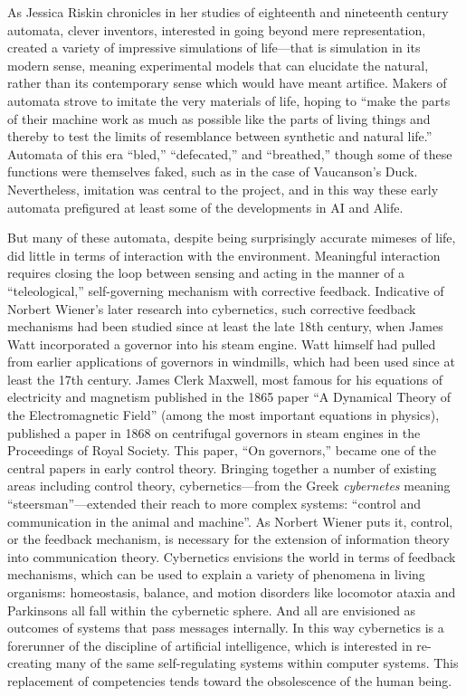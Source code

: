 As Jessica Riskin chronicles in her studies of eighteenth and
nineteenth century automata, clever inventors, interested in going
beyond mere representation, created a variety of impressive
simulations of life---that is simulation in its modern sense, meaning
experimental models that can elucidate the natural, rather than its
contemporary sense which would have meant artifice.\cite[p. ??]{riskinDuck}
Makers of automata strove to imitate the very materials of life,
hoping to ``make the parts of their machine work as much as possible
like the parts of living things and thereby to test the limits of
resemblance between synthetic and natural life.''\cite[p. ??]{riskinDuck}
Automata of this era ``bled,'' ``defecated,'' and ``breathed,'' though some
of these functions were themselves faked, such as in the case of
Vaucanson's Duck. Nevertheless, imitation was central to the project,
and in this way these early automata prefigured at least some of the
developments in AI and Alife.

But many of these automata, despite being surprisingly accurate
mimeses of life, did little in terms of interaction with the
environment. Meaningful interaction requires closing the loop between
sensing and acting in the manner of a
 ``teleological,'' self-governing mechanism with corrective feedback.
 Indicative of Norbert Wiener's later research into cybernetics, such
 corrective feedback mechanisms had been studied since at least the
 late 18th century, when James Watt incorporated a governor into his
 steam engine. Watt himself had pulled from earlier applications of
 governors in windmills, which had been used since at least the 17th
 century.\cite{richardhills} James Clerk Maxwell, most famous for his equations of
 electricity and magnetism published in the 1865 paper ``A Dynamical
 Theory of the Electromagnetic Field'' (among the most important
 equations in physics), published a paper in 1868 on centrifugal
 governors in steam engines in the Proceedings of Royal Society. This
 paper, ``On governors,'' became one of the central papers in early
 control theory.\cite{ottomayr} Bringing together a number of existing
 areas including control theory,
 cybernetics---from the Greek \emph{cybernetes} meaning
 ``steersman''\cite[p. 6]{wienerMainIdeas}---extended their reach to more complex
 systems: ``control and communication in the animal and machine''. As
 Norbert Wiener puts it, control, or the
 feedback mechanism, is necessary for the extension of information
 theory into communication theory. Cybernetics envisions the world in
 terms of feedback mechanisms, which can be used to explain a variety
 of phenomena in living organisms: homeostasis, balance, and motion
 disorders like locomotor ataxia and Parkinsons all fall within the
 cybernetic sphere\cite[p. 10-15]{wienerMainIdeas}. And all are envisioned
 as outcomes of systems that pass messages internally. In this way
 cybernetics is a forerunner of the discipline of
 artificial intelligence, which is interested in re-creating many of the same
 self-regulating systems within computer systems. This replacement of
 competencies tends toward the obsolescence of the human being.

